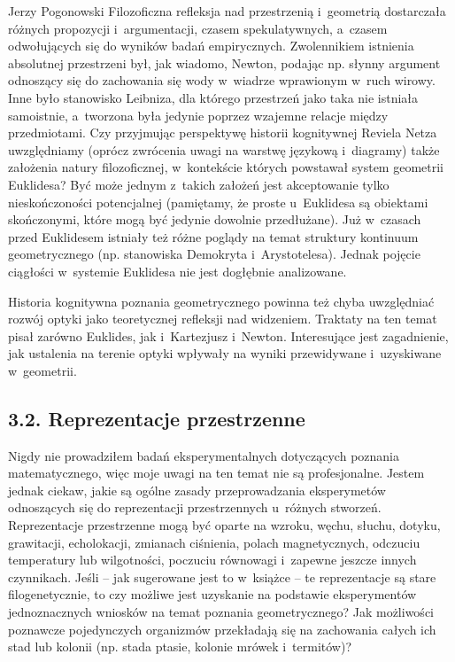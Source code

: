 \begin{newrevplenv}{Jerzy Pogonowski}
Filozoficzna refleksja nad przestrzenią i~geometrią dostarczała
różnych propozycji i~argumentacji, czasem spekulatywnych, a~czasem
odwołujących się do wyników badań empirycznych. Zwolennikiem
istnienia absolutnej przestrzeni był, jak wiadomo, Newton, podając
np. słynny argument odnoszący się do zachowania się wody w~wiadrze
wprawionym w~ruch wirowy. Inne było stanowisko Leibniza, dla
którego przestrzeń jako taka nie istniała samoistnie, a~tworzona
była jedynie poprzez wzajemne relacje między przedmiotami. Czy
przyjmując perspektywę historii kognitywnej Reviela Netza
uwzględniamy (oprócz zwrócenia uwagi na warstwę językową i~diagramy) także założenia natury filozoficznej, w~kontekście
których powstawał system geometrii Euklidesa? Być może jednym z~takich założeń jest akceptowanie tylko nieskończoności
potencjalnej (pamiętamy, że proste u~Euklidesa są obiektami
skończonymi, które mogą być jedynie dowolnie przedłużane). Już w~czasach przed Euklidesem istniały też różne poglądy na temat
struktury kontinuum geometrycznego (np. stanowiska Demokryta i~Arystotelesa). Jednak pojęcie ciągłości w~systemie Euklidesa nie
jest dogłębnie analizowane.

Historia kognitywna poznania geometrycznego powinna też chyba
uwzględniać rozwój optyki jako teoretycznej refleksji nad
widzeniem. Traktaty na ten temat pisał zarówno Euklides, jak i~Kartezjusz i~Newton. Interesujące jest zagadnienie, jak ustalenia
na terenie optyki wpływały na wyniki przewidywane i~uzyskiwane w~geometrii.

\subsection{3.2. Reprezentacje przestrzenne}

Nigdy nie prowadziłem badań eksperymentalnych dotyczących poznania
matematycznego, więc moje uwagi na ten temat nie są profesjonalne.
Jestem jednak ciekaw, jakie są ogólne zasady przeprowadzania
eksperymetów odnoszących się do reprezentacji przestrzennych u~różnych stworzeń. Reprezentacje przestrzenne mogą być oparte na
wzroku, węchu, słuchu, dotyku, grawitacji, echolokacji, zmianach
ciśnienia, polach magnetycznych, odczuciu temperatury lub
wilgotności, poczuciu równowagi i~zapewne jeszcze innych
czynnikach. Jeśli -- jak sugerowane jest to w~książce -- te
reprezentacje są stare filogenetycznie, to czy możliwe jest
uzyskanie na podstawie eksperymentów jednoznacznych wniosków na
temat poznania geometrycznego? Jak możliwości poznawcze
pojedynczych organizmów przekładają się na zachowania całych ich
stad lub kolonii (np. stada ptasie, kolonie mrówek i~termitów)?


\end{newrevplenv}
